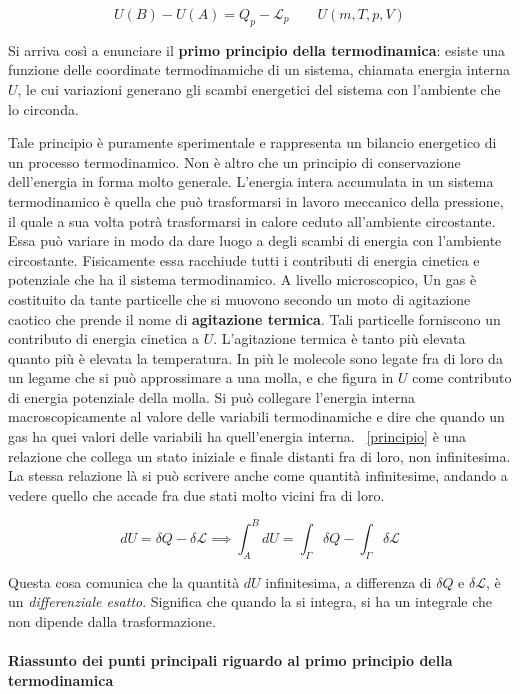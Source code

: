 \begin{equation}
	\label{principio}
	\boxed{U(B)-U(A) = Q_p - \mathcal{L}_p \qquad U(m,T,p,V)}
\end{equation}

Si arriva così a enunciare il \textbf{primo principio della termodinamica}: esiste una funzione delle coordinate termodinamiche di un sistema, chiamata energia interna $U$, le cui variazioni generano gli scambi energetici del sistema con l'ambiente che lo circonda.

Tale principio è puramente sperimentale e rappresenta un bilancio energetico di un processo termodinamico. Non è altro che un principio di conservazione dell'energia in forma molto generale. L'energia intera accumulata in un sistema termodinamico è quella che può trasformarsi in lavoro meccanico della pressione, il quale a sua volta potrà trasformarsi in calore ceduto all'ambiente circostante. Essa può variare in modo da dare luogo a degli scambi di energia con l'ambiente circostante. Fisicamente essa racchiude tutti i contributi di energia cinetica e potenziale che ha il sistema termodinamico.
A livello microscopico, Un gas è costituito da tante particelle che si muovono secondo un moto di agitazione caotico che prende il nome di \textbf{agitazione termica}. Tali particelle forniscono un contributo di energia cinetica a $U$. L'agitazione termica è tanto più elevata quanto più è elevata la temperatura.
In più le molecole sono legate fra di loro da un legame che si può approssimare a una molla, e che figura in $U$ come contributo di energia potenziale della molla.
Si può collegare l'energia interna macroscopicamente al valore delle variabili termodinamiche e dire che quando un gas ha quei valori delle variabili ha quell'energia interna.
~\eqref{principio} è una relazione che collega un stato iniziale e finale distanti fra di loro, non infinitesima. La stessa relazione là si può scrivere anche come quantità infinitesime, andando a vedere quello che accade fra due stati molto vicini fra di loro.

\[
	dU = \delta Q - \delta\mathcal{L} \implies \int_A^B dU = \int_{\Gamma} \delta Q - \int_{\Gamma} \delta\mathcal{L}
\]

Questa cosa comunica che la quantità $dU$ infinitesima, a differenza di $\delta Q$ e $\delta\mathcal{L}$, è un \emph{differenziale esatto}. Significa che quando la si integra, si ha un integrale che non dipende dalla trasformazione.

\paragraph{Riassunto dei punti principali riguardo al primo principio della termodinamica}

